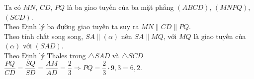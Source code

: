 \begin{ex}
{\begin{center}
		\end{center}
		Ta có $MN$, $CD$, $PQ$ là ba giao tuyến của ba mặt phẳng $(ABCD)$, $(MNPQ)$, $(SCD)$.\\ Theo Định lý ba đường giao tuyến ta suy ra $MN \parallel CD \parallel PQ$.\\
		Theo tính chất song song, $SA \parallel (\alpha)$ nên $SA \parallel MQ$, với $MQ$ là giao tuyến của $(\alpha)$ với $(SAD)$.\\
		Theo Định lý Thales trong $\triangle SAD$ và $\triangle SCD$\\
		$\dfrac{PQ}{CD} = \dfrac{SQ}{SD} = \dfrac{AM}{AD} = \dfrac{2}{3} \Rightarrow PQ = \dfrac{2}{3} \cdot 9{,}3 = 6{,}2$.
	}
\end{ex}
